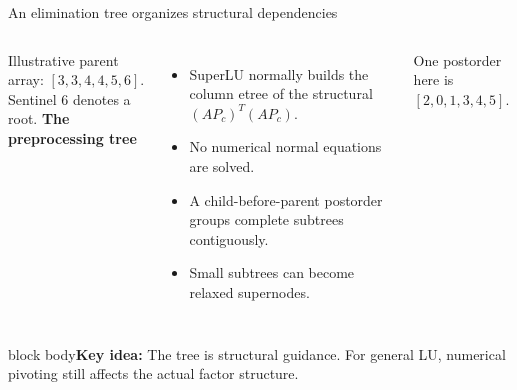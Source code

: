 \documentclass[aspectratio=169,10pt]{beamer}
\newcommand{\takeaway}[1]{\vfill\begin{beamercolorbox}[sep=7pt,wd=\textwidth]{block body}\small\textbf{Key idea:} #1\end{beamercolorbox}}
\begin{document}
\begin{frame}{An elimination tree organizes structural dependencies}
\begin{columns}[c,onlytextwidth]
\centering
{}
\par\small Illustrative parent array: $[3,3,4,4,5,6]$.\\Sentinel $6$ denotes a root.
\textbf{The preprocessing tree}
\begin{itemize}\setlength\itemsep{6pt}
\item SuperLU normally builds the column etree of the structural $(AP_c)^T(AP_c)$.
\item No numerical normal equations are solved.
\item A child-before-parent postorder groups complete subtrees contiguously.
\item Small subtrees can become relaxed supernodes.
\end{itemize}
\vspace{.2cm}\small One postorder here is $[2,0,1,3,4,5]$.
\end{columns}
\takeaway{The tree is structural guidance. For general LU, numerical pivoting still affects the actual factor structure.}
\end{frame}
\end{document}

